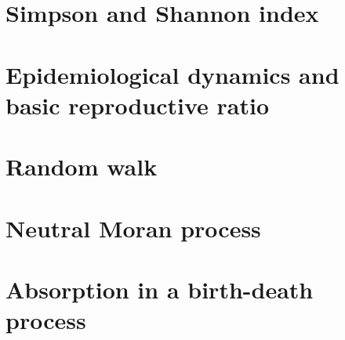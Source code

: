 \newcommand{\package}{\emph}

\setcounter{chapter}{1}
\setcounter{section}{0}
\section{Simpson and Shannon index}

\setcounter{chapter}{2}
\setcounter{section}{0}
\section{Epidemiological dynamics and basic reproductive ratio}

\setcounter{chapter}{3}
\setcounter{section}{0}
\section{Random walk}


\setcounter{chapter}{4}
\setcounter{section}{0}
\section{Neutral Moran process}


\setcounter{chapter}{5}
\setcounter{section}{0}
\section{Absorption in a birth-death process}

